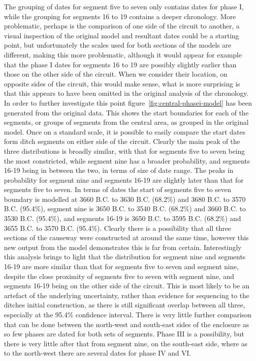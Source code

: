 The grouping of dates for segment five to seven only contains dates for phase I, while the grouping for segments 16 to 19 contains a deeper chronology. More problematic, perhaps is the comparison of one side of the circuit to another, a visual inspection of the original model and resultant dates could be a starting point, but unfortunately the scales used for both sections of the models are different, making this more problematic, although it would appear for example that the phase I dates for segments 16 to 19 are possibly slightly earlier than those on the other side of the circuit. When we consider their location, on opposite sides of the circuit, this would make sense, what is more surprising is that this appears to have been omitted in the original analysis of the chronology.  In order to further investigate this point figure~\ref{fig:central-phasei-model} has been generated from the original data. This shows the start boundaries for each of the segments, or groups of segments from the central area, as grouped in the original model. Once on a standard scale, it is possible to easily compare the start dates form ditch segments on either side of the circuit. Clearly the main peak of the three distributions is broadly similar, with that for segments five to seven being the most constricted, while segment nine has a broader probability, and segments 16-19 being in between the two, in terms of size of date range. The peaks in probability for segment nine and segments 16-19 are slightly later than that for segments five to seven. In terms of dates the start of segments five to seven boundary is modelled at 3660 B.C. to 3630 B.C. (68.2\%) and 3680 B.C. to 3570 B.C. (95.4\%), segment nine is 3650 B.C. to 3540 B.C. (68.2\%) and 3660 B.C. to 3530 B.C. (95.4\%), and segments 16-19 is 3650 B.C. to 3595 B.C. (68.2\%) and 3655 B.C. to 3570 B.C. (95.4\%). Clearly there is a possibility that all three sections of the causeway were constructed at around the same time, however this new output from the model demonstrates this is far from certain. Interestingly this analysis brings to light that the distribution for segment nine and segments 16-19 are more similar than that for segments five to seven and segment nine, despite the close proximity of segments five to seven with segment nine, and segments 16-19 being on the other side of the circuit. This is most likely to be an artefact of the underlying uncertainty, rather than evidence for sequencing to the ditches initial construction, as there is still significant overlap between all three, especially at the 95.4\% confidence interval.
There is very little further comparison that can be done between the north-west and south-east sides of the enclosure as so few phases are dated for both sets of segments. Phase III is a possibility, but there is very little after that from segment nine, on the south-east side, where as to the north-west there are several dates for phase IV and VI.

